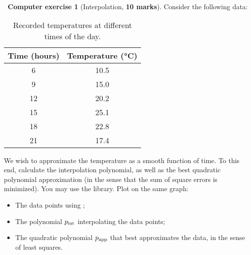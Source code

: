 \documentclass[10pt]{article}
\theoremstyle{definition}
\newtheorem{compexercise}{{\normalfont \faLaptop}~Computer exercise}
\theoremstyle{remark}
\begin{document}
\begin{compexercise}
    [Interpolation, \textbf{10 marks}]
    Consider the following data:
    \begin{table}[h!]
        \centering
        \begin{tabular}{|c|c|}
            \hline
            \textbf{Time (hours)} & \textbf{Temperature (°C)} \\
            \hline
            6  & 10.5 \\
            \hline
            9  & 15.0 \\
            \hline
            12 & 20.2 \\
            \hline
            15 & 25.1 \\
            \hline
            18 & 22.8 \\
            \hline
            21 & 17.4 \\
            \hline
        \end{tabular}
        \caption{Recorded temperatures at different times of the day.}
    \end{table}

    We wish to approximate the temperature as a smooth function of time.
    To this end, calculate the interpolation polynomial, 
    as well as the best quadratic polynomial approximation (in the sense that the sum of square errors is minimized).
    You may use the  library.
    Plot on the same graph:
    \begin{itemize}
        \item The data points using ;
        \item The polynomial $p_{\rm int}$ interpolating the data points;
        \item The quadratic polynomial $p_{\rm app}$ that best approximates the data,
            in the sense of least squares.
    \end{itemize}
\end{compexercise}
\end{document}
